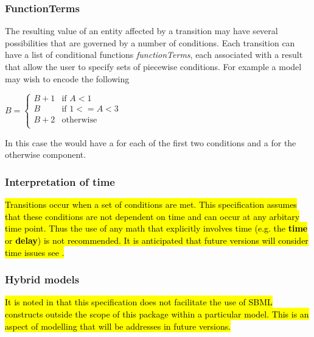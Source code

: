 \subsubsection{FunctionTerms}

The resulting value of an entity affected by a transition may have several possibilities that are governed by a number of conditions. Each transition can have a list of conditional functions \emph{functionTerms}, each associated with a result that allow the user to specify sets of piecewise conditions. For example a model may wish to encode the following
\smallskip
\begin{center}
$B = \left\{ \begin{array}{ll}
      B+1 & \mbox{if $A < 1$} \\
      B & \mbox{if $1 <= A < 3$} \\
     B + 2 & \mbox{otherwise}  \\
     \end{array}
\right.
$
\end{center}

\smallskip
In this case the \Transition would have a \FunctionTerm for each of the first two conditions and a \DefaultTerm for the otherwise component.


\subsubsection{Interpretation of time}

\hl{
Transitions occur when a set of conditions are met.  This specification assumes that these conditions are not dependent on time and can occur at any arbitary time point.  Thus the use of any math that explicitly involves time (e.g. the  \textbf{time} or \textbf{delay}) is not recommended. It is anticipated that future versions will consider time issues see .
}


\subsubsection{Hybrid models}

\hl{
It is noted in  that this specification does not facilitate the use of SBML constructs outside the scope of this package within a particular model.  This is an aspect of modelling that will be addresses in future versions.
}






